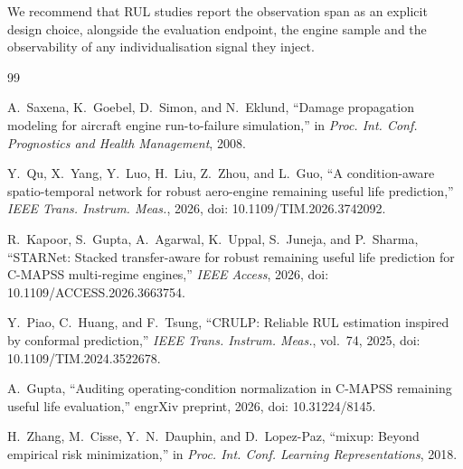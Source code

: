 \documentclass[journal]{IEEEtran}
\begin{document}
We recommend that RUL studies report the observation span as an explicit design choice, alongside the evaluation endpoint, the engine sample and the observability of any individualisation signal they inject.

\begin{thebibliography}{99}

 A.~Saxena, K.~Goebel, D.~Simon, and N.~Eklund, ``Damage propagation modeling for aircraft engine run-to-failure simulation,'' in \emph{Proc. Int. Conf. Prognostics and Health Management}, 2008.

 Y.~Qu, X.~Yang, Y.~Luo, H.~Liu, Z.~Zhou, and L.~Guo, ``A condition-aware spatio-temporal network for robust aero-engine remaining useful life prediction,'' \emph{IEEE Trans. Instrum. Meas.}, 2026, doi: 10.1109/TIM.2026.3742092.

 R.~Kapoor, S.~Gupta, A.~Agarwal, K.~Uppal, S.~Juneja, and P.~Sharma, ``STARNet: Stacked transfer-aware for robust remaining useful life prediction for C-MAPSS multi-regime engines,'' \emph{IEEE Access}, 2026, doi: 10.1109/ACCESS.2026.3663754.

 Y.~Piao, C.~Huang, and F.~Tsung, ``CRULP: Reliable RUL estimation inspired by conformal prediction,'' \emph{IEEE Trans. Instrum. Meas.}, vol.~74, 2025, doi: 10.1109/TIM.2024.3522678.

 A.~Gupta, ``Auditing operating-condition normalization in C-MAPSS remaining useful life evaluation,'' engrXiv preprint, 2026, doi: 10.31224/8145.

 H.~Zhang, M.~Cisse, Y.~N.~Dauphin, and D.~Lopez-Paz, ``mixup: Beyond empirical risk minimization,'' in \emph{Proc. Int. Conf. Learning Representations}, 2018.

\end{thebibliography}
\end{document}
